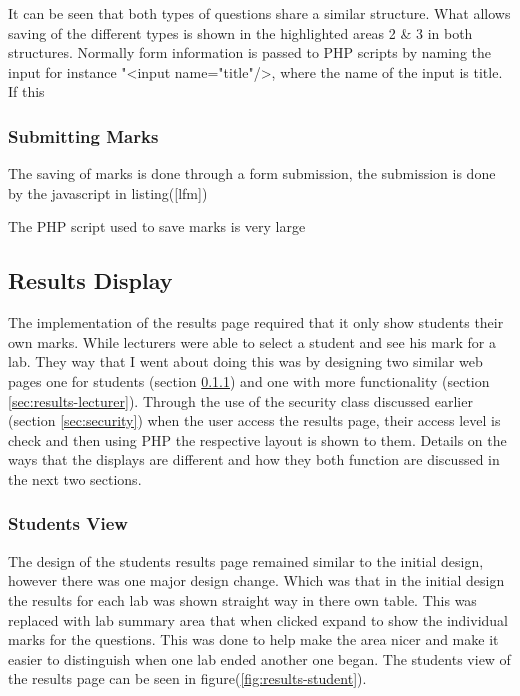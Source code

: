 \documentclass[12pt]{article}  %
\begin{document}
It can be seen that both types of questions share a similar structure. What allows saving of the different types is shown in the highlighted areas 2 \& 3 in both structures. Normally form information is passed to PHP scripts by naming the input for instance "\textless input name="title"/\textgreater, where the name of the input is title. If this 



\subsubsection{Submitting Marks}

The saving of marks is done through a form submission, the submission is done by the javascript in listing([lfm])




The PHP script used to save marks is very large




\subsection{Results Display}

The implementation of the results page required that it only show students their own marks. While lecturers were able to select a student and see his mark for a lab. They way that I went about doing this was by designing two similar web pages one for students (section \ref{sec:results-student}) and one with more functionality (section \ref{sec:results-lecturer}). Through the use of the security class discussed earlier (section \ref{sec:security}) when the user access the results page, their access level is check and then using PHP the respective layout is shown to them. Details on the ways that the displays are different and how they both function are discussed in the next two sections.



\subsubsection{Students View} \label{sec:results-student}

The design of the students results page remained similar to the initial design, however there was one major design change. Which was that in the initial design the results for each lab was shown straight way in there own table. This was replaced with lab summary area that when clicked expand to show the individual marks for the questions. This was done to help make the area nicer and make it easier to distinguish when one lab ended another one began. The students view of the results page can be seen in figure(\ref{fig:results-student}).
\end{document}
